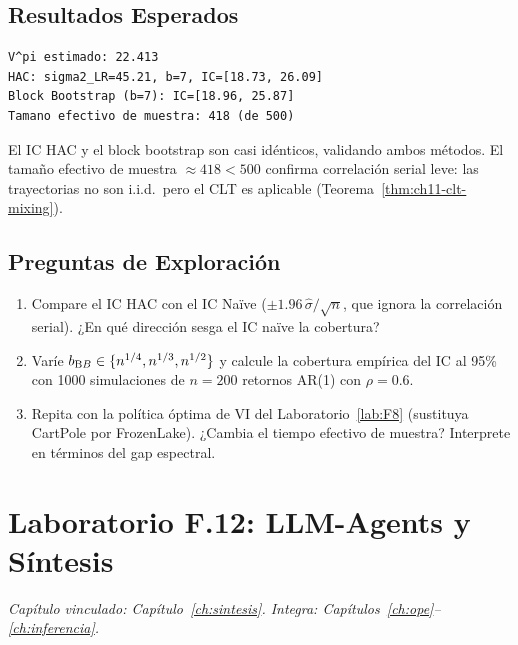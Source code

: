 \subsection*{Resultados Esperados}

\begin{verbatim}
V^pi estimado: 22.413
HAC: sigma2_LR=45.21, b=7, IC=[18.73, 26.09]
Block Bootstrap (b=7): IC=[18.96, 25.87]
Tamano efectivo de muestra: 418 (de 500)
\end{verbatim}

El IC HAC y el block bootstrap son casi idénticos, validando ambos métodos.
El tamaño efectivo de muestra $\approx 418 < 500$ confirma correlación serial
leve: las trayectorias no son i.i.d.\ pero el CLT es aplicable
(Teorema~\ref{thm:ch11-clt-mixing}).

\subsection*{Preguntas de Exploración}

\begin{enumerate}
    \item Compare el IC HAC con el IC Naïve ($\pm 1.96\,\hat\sigma/\sqrt{n}$,
          que ignora la correlación serial). ¿En qué dirección sesga el IC
          naïve la cobertura?
    \item Varíe $b_{\textrm BB} \in \{n^{1/4}, n^{1/3}, n^{1/2}\}$ y calcule
          la cobertura empírica del IC al 95\% con 1000 simulaciones
          de $n=200$ retornos AR(1) con $\rho=0.6$.
    \item Repita con la política óptima de VI del Laboratorio~\ref{lab:F8}
          (sustituya CartPole por FrozenLake). ¿Cambia el tiempo efectivo
          de muestra? Interprete en términos del gap espectral.
\end{enumerate}

\section{Laboratorio F.12: LLM-Agents y Síntesis}
\label{lab:F12}
\textit{Capítulo vinculado: Capítulo~\ref{ch:sintesis}.
Integra: Capítulos~\ref{ch:ope}--\ref{ch:inferencia}.}

